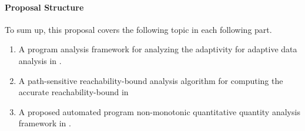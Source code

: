 \paragraph*{Proposal Structure}
To sum up, this proposal covers the following topic in each following part.
\begin{enumerate}
    \item A program analysis framework for analyzing the adaptivity for adaptive data analysis in .
    \item A path-sensitive reachability-bound analysis algorithm for computing the accurate reachability-bound in 
\item A proposed automated program non-monotonic quantitative quantity analysis framework in .
\end{enumerate}